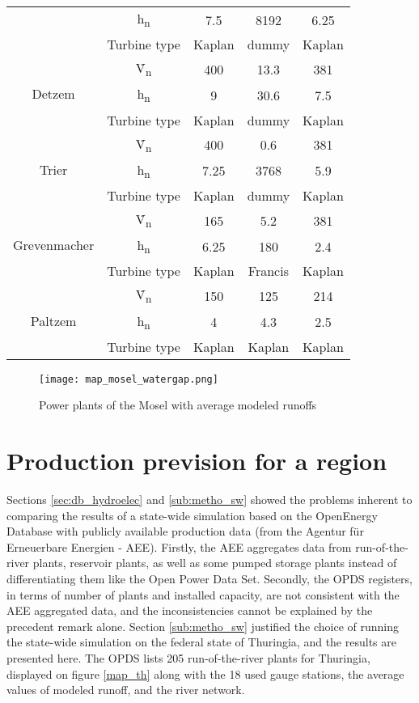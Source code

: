 \begin{longtable}{|c|c|c|c|c|}
  &h\textsubscript{n}&7.5&8192&6.25\\
  &Turbine type&Kaplan&dummy&Kaplan\\
  \hline
  \multirow{3}{*}{Detzem}&\.V\textsubscript{n}&400&13.3&381\\
  &h\textsubscript{n}&9&30.6&7.5\\
  &Turbine type&Kaplan&dummy&Kaplan\\
  \hline
  \multirow{3}{*}{Trier}&\.V\textsubscript{n}&400&0.6&381\\
  &h\textsubscript{n}&7.25&3768&5.9\\
  &Turbine type&Kaplan&dummy&Kaplan\\
  \hline
  \multirow{3}{*}{Grevenmacher}&\.V\textsubscript{n}&165&5.2&381\\
  &h\textsubscript{n}&6.25&180&2.4\\
  &Turbine type&Kaplan&Francis&Kaplan\\
  \hline
  \multirow{3}{*}{Paltzem}&\.V\textsubscript{n}&150&125&214\\
  &h\textsubscript{n}&4&4.3&2.5\\
  &Turbine type&Kaplan&Kaplan&Kaplan\\
\end{longtable}
\endgroup

\begin{figure}[H]
\centering
\texttt{[image: map\_mosel\_watergap.png]}
\caption{Power plants of the Mosel with average modeled runoffs}
\label{map_mosel_watergap}
\end{figure}

\section{Production prevision for a region}
\label{sec:res_th}

Sections \ref{sec:db_hydroelec} and \ref{sub:metho_sw} showed the problems inherent to comparing the results of a state-wide simulation based on the OpenEnergy Database with publicly available production data (from the Agentur für Erneuerbare Energien - AEE). Firstly, the AEE aggregates data from run-of-the-river plants, reservoir plants, as well as some pumped storage plants instead of differentiating them like the Open Power Data Set. Secondly, the OPDS registers, in terms of number of plants and installed capacity, are not consistent with the AEE aggregated data, and the inconsistencies cannot be explained by the precedent remark alone. \newline
Section \ref{sub:metho_sw} justified the choice of running the state-wide simulation on the federal state of Thuringia, and the results are presented here. \newline
The OPDS lists 205 run-of-the-river plants for Thuringia, displayed on figure \ref{map_th} along with the 18 used gauge stations, the average values of modeled runoff, and the river network.

